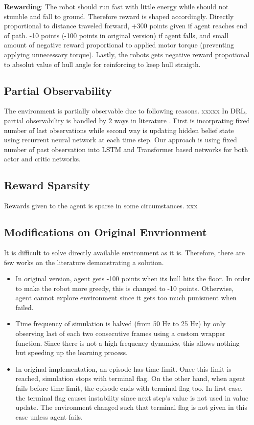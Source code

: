 \textbf{Rewarding}: The robot should run fast with little energy while should not stumble and fall to ground. Therefore reward is shaped accordingly. Directly proportional to distance traveled forward, +300 points given if agent reaches end of path. -10 points (-100 points in original version)  if agent falls, and small amount of negative reward proportional to applied motor torque (preventing applying unnecessary torque). Lastly, the robots gets negative reward propotional to absolut value of hull angle for reinforcing to keep hull straigth. \\
\subsection{Partial Observability}
The environment is partially observable due to following reasons.
xxxxx
In DRL, partial observability is handled by 2 ways in literature \cite{dulac-arnold_challenges_2019}. First is incorprating fixed number of last observations while second way is updating hidden belief state using recurrent neural network at each time step. Our approach is using fixed number of past observation into LSTM and Transformer based networks for both actor and critic networks. \\
\subsection{Reward Sparsity}
Rewards given to the agent is sparse in some circumstances. 
xxx
\subsection{Modifications on Original Envrionment}
It is difficult to solve directly available environment as it is. Therefore, there are few works on the literature demonstrating a solution. 
\begin{itemize}
	\item In original version, agent gets -100 points when its hull hits the floor. In order to make the robot more greedy, this is changed to -10 points. Otherwise, agent cannot explore environment since it gets too much punisment when failed.
	\item Time frequency of simulation is halved (from 50 Hz to 25 Hz) by only observing last of each two consecutive frames using a custom wrapper function. Since there is not a high frequency dynamics, this allows nothing but speeding up the learning process.
	\item In original implementation, an episode has time limit. Once this limit is reached, simulation stops with terminal flag. On the other hand, when agent fails before time limit, the episode ends with terminal flag too. In first case, the terminal flag causes instability since next step's value is not used in value update. The environment changed such that terminal flag is not given in this case unless agent fails.
\end{itemize}
